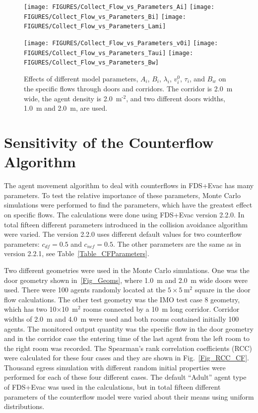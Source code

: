 \documentclass[12pt,a4paper,final,twoside]{stylevk}
\begin{document}
%
\begin{figure}[!tb]
  \centerline{ \texttt{[image: FIGURES/Collect\_Flow\_vs\_Parameters\_Ai]}  
  \texttt{[image: FIGURES/Collect\_Flow\_vs\_Parameters\_Bi]} 
  \texttt{[image: FIGURES/Collect\_Flow\_vs\_Parameters\_Lami]} }  
  \centerline{ \texttt{[image: FIGURES/Collect\_Flow\_vs\_Parameters\_v0i]}  
  \texttt{[image: FIGURES/Collect\_Flow\_vs\_Parameters\_Taui]} 
  \texttt{[image: FIGURES/Collect\_Flow\_vs\_Parameters\_Bw]} }
  \caption{Effects of different model parameters, $A_i$, $B_i$,
    $\lambda_i$, $v^0_i$, $\tau_i$, and $B_w$ on the specific flows
    through doors and corridors.  The corridor is 2.0~m wide, the
    agent density is 2.0~$\mathrm{ \textrm{m}^\textrm{-2} }$, and two
    different doors widths, 1.0~m and 2.0~m, are used.
    \protect\hspace{200mm}}\label{Fig_Door1}
\end{figure}
%


\section{Sensitivity of the Counterflow Algorithm}\label{Sec_CFSensi}

\noindent The agent movement algorithm to deal with counterflows in
FDS+Evac has many parameters.  To test the relative importance of
these parameters, Monte Carlo simulations were performed to find the
parameters, which have the greatest effect on specific flows.  The
calculations were done using FDS+Evac version 2.2.0.  In total fifteen
different parameters introduced in the collision avoidance algorithm
were varied.  The version 2.2.0 uses different default values for two
counterflow parameters: $c_{df}=0.5$ and $c_{ncf}=0.5$.  The other
parameters are the same as in version 2.2.1, see
Table~\ref{Table_CFParameters}.


Two different geometries were used in the Monte Carlo simulations.
One was the door geometry shown in~\ref{Fig_Geoms}, where 1.0~m and
2.0~m wide doors were used.  There were 100 agents randomly located at
the $5 \times 5 ~\mathrm{ \textrm{m}^\textrm{2} } $ square in the door
flow calculations.  The other test geometry was the IMO test case 8
geometry, which has two 10$\times$10~$\mathrm{m^2}$ rooms connected by
a 10~m long corridor.  Corridor widths of 2.0~m and 4.0~m were used
and both rooms contained initially 100 agents.  The monitored output
quantity was the specific flow in the door geometry and in the
corridor case the entering time of the last agent from the left room
to the right room was recorded.  The Spearman's rank correlation
coefficients (RCC) were calculated for these four cases and they are
shown in Fig.~\ref{Fig_RCC_CF}.  Thousand egress simulation with
different random initial properties were performed for each of these
four different cases.  The default ``Adult'' agent type of FDS+Evac
was used in the calculations, but in total fifteen different
parameters of the counterflow model were varied about their means
using uniform distributions.
\end{document}
